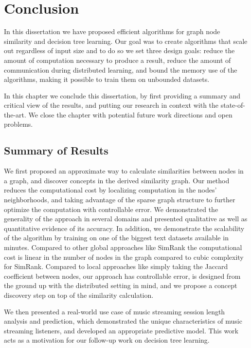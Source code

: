 \chapter{Conclusion}

In this dissertation we have proposed efficient algorithms for graph node
similarity and decision tree learning. Our goal was to create
algorithms that scale out regardless of input size and to do so
we set three design goals: reduce the amount of computation
necessary to produce a result, reduce the amount of communication
during distributed learning, and bound the memory use of the algorithms,
making it possible to train them on unbounded datasets.

In this chapter we conclude this dissertation, by first providing a
summary and critical view of the results, and putting our research
in context with the state-of-the-art.
We close the chapter with potential future work directions and open
problems.

\section{Summary of Results}
We first proposed an approximate way to calculate similarities between
nodes in a graph, and discover concepts in the derived similarity
graph. Our method reduces the computational cost
by localizing computation in the nodes' neighborhoods, and taking advantage
of the sparse graph structure to further optimize the computation with controllable
error. We demonstrated the generality of the approach in several domains and presented
qualitative as well as quantitative evidence of its accuracy. In addition, we demonstrate
the scalability of the algorithm by training on one of the biggest text datasets
available in minutes. Compared to other global approaches like SimRank \cite{simrank}
the computational cost is linear in the number of nodes in the graph compared to cubic
complexity for SimRank.
Compared to local approaches like simply taking the Jaccard coefficient between nodes, our
approach has controllable error, is designed from the ground up with the distributed
setting in mind, and we propose a concept discovery step on top of the similarity
calculation.

We then presented a real-world use case of music streaming session length analysis and prediction,
which demonstrated the unique characteristics of music streaming listeners, and developed
an appropriate predictive model. This work acts as a motivation for our follow-up work
on decision tree learning.

